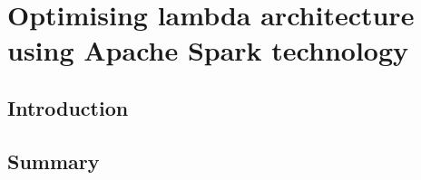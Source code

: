 \chapter{Optimising lambda architecture using Apache Spark technology} \label{spark-eva}


\section{Introduction} \label{spark-intro}
\section{Summary} \label{spark-summ}


